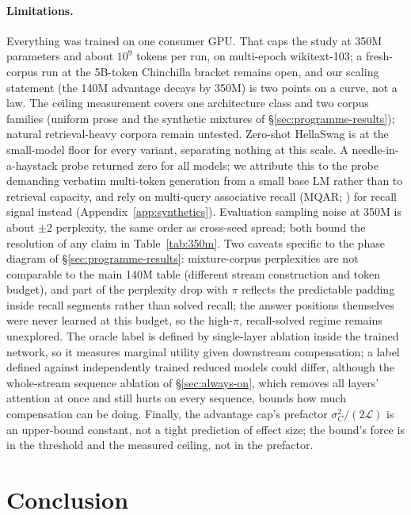 \documentclass[11pt,a4paper]{article}
\newcommand{\LL}{\mathcal{L}}
\begin{document}
\paragraph{Limitations.}
\label{sec:limits}
Everything was trained on one consumer GPU. That caps the study at 350M
parameters and about $10^9$ tokens per run, on multi-epoch wikitext-103;
a fresh-corpus run at the 5B-token Chinchilla bracket remains open, and
our scaling statement (the 140M advantage decays by 350M) is two points
on a curve, not a law. The ceiling measurement covers one architecture
class and two corpus families (uniform prose and the synthetic mixtures
of \S\ref{sec:programme-results}); natural retrieval-heavy corpora
remain untested. Zero-shot HellaSwag is at the
small-model floor for every variant, separating nothing at this scale.
A needle-in-a-haystack probe returned zero for all models; we attribute
this to the probe demanding verbatim multi-token generation from a small
base LM rather than to retrieval capacity, and rely on multi-query
associative recall (MQAR; \citealp{zoology}) for recall signal instead
(Appendix~\ref{app:synthetics}). Evaluation
sampling noise at 350M is about $\pm 2$ perplexity, the same order as
cross-seed spread; both bound the resolution of any claim in
Table~\ref{tab:350m}. Two caveats specific to the phase diagram of
\S\ref{sec:programme-results}: mixture-corpus perplexities are not
comparable to the main 140M table (different stream construction and
token budget), and part of the perplexity drop with $\pi$ reflects the
predictable padding inside recall segments rather than solved recall;
the answer positions themselves were never learned at this budget, so
the high-$\pi$, recall-solved regime remains unexplored.
The oracle label is defined by single-layer ablation inside the trained
network, so it measures marginal utility given downstream compensation;
a label defined against independently trained reduced models could
differ, although the whole-stream sequence ablation of
\S\ref{sec:always-on}, which removes all layers' attention at once and
still hurts on every sequence, bounds how much compensation can be doing.
Finally, the advantage cap's prefactor $\sigma_C^2/(2\LL)$ is an
upper-bound constant, not a tight prediction of effect size; the bound's
force is in the threshold and the measured ceiling, not in the
prefactor.

\section{Conclusion}
\end{document}
